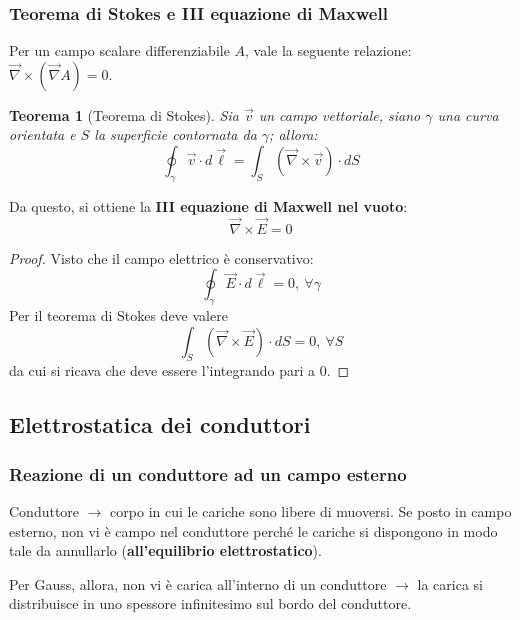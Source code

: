 \documentclass[a4paper]{scrartcl}
\numberwithin{equation}{subsection}
\theoremstyle{style1}
\newtheorem{teorema}{Teorema}[section]
\newenvironment{boxenv}[1][]{
    \begin{eqbox}[#1]
    }{
   \end{eqbox}
}
\begin{document}
\subsubsection{Teorema di Stokes e III equazione di Maxwell}
Per un campo scalare differenziabile $A$, vale la seguente relazione: $\vec{\nabla }\times (\vec{\nabla }A) = 0$.
\begin{teorema}
	[Teorema di Stokes]
	Sia $\vec{v}$ un campo vettoriale, siano $\gamma$ una curva orientata e $S$ la superficie contornata da $\gamma$; allora:
	\begin{equation}
		\oint_{\gamma} \vec{v}\cdot d\vec{\ell } = \int_{S}  (\vec{\nabla }\times \vec{v}) \cdot  dS
	\end{equation}
\end{teorema}
\noindent Da questo, si ottiene la \textbf{III equazione di Maxwell nel vuoto}:
\begin{equation}
	\vec{\nabla }\times \vec{E} = 0
\end{equation}
\begin{boxenv}[]
\begin{proof}
	Visto che il campo elettrico \`e conservativo:
	\[
	\oint_{\gamma} \vec{E}\cdot d\vec{\ell } = 0, \ \forall \gamma
	\] 
	Per il teorema di Stokes deve valere
	\[
	\int_{S}  (\vec{\nabla }\times \vec{E}) \cdot  dS = 0, \ \forall S
	\] 
	da cui si ricava che deve essere l'integrando pari a $0$.
\end{proof}
\end{boxenv}
\subsection{Elettrostatica dei conduttori}
\subsubsection{Reazione di un conduttore ad un campo esterno}


Conduttore $\to$ corpo in cui le cariche sono libere di muoversi. Se posto in campo esterno, non vi \`e campo nel conduttore perch\'e le cariche si dispongono in modo tale da annullarlo (\textbf{all'equilibrio elettrostatico}).

Per Gauss, allora, non vi \`e carica all'interno di un conduttore $\to$ la carica si distribuisce in uno spessore infinitesimo sul bordo del conduttore.
\end{document}
